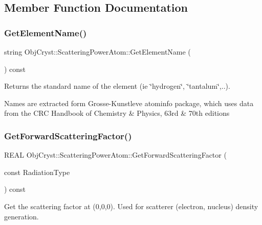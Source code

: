 \subsection{Member Function Documentation}
\mbox{\label{class_obj_cryst_1_1_scattering_power_atom_a149d682bc467b524ff42c5ab69b678ba}} 
\subsubsection{\texorpdfstring{GetElementName()}{GetElementName()}}
{\footnotesize\ttfamily string Obj\+Cryst\+::\+Scattering\+Power\+Atom\+::\+Get\+Element\+Name (\begin{DoxyParamCaption}{ }\end{DoxyParamCaption}) const}



Returns the standard name of the element (ie \char`\"{}hydrogen\char`\"{}, \char`\"{}tantalum\char`\"{},..). 

Names are extracted form Grosse-\/\+Kunstleve \textquotesingle{}atominfo\textquotesingle{} package, which uses data from the C\+RC Handbook of Chemistry \& Physics, 63rd \& 70th editions \mbox{\label{class_obj_cryst_1_1_scattering_power_atom_abe4d6e3b47759d143b5686abf490744f}} 
\subsubsection{\texorpdfstring{GetForwardScatteringFactor()}{GetForwardScatteringFactor()}}
{\footnotesize\ttfamily R\+E\+AL Obj\+Cryst\+::\+Scattering\+Power\+Atom\+::\+Get\+Forward\+Scattering\+Factor (\begin{DoxyParamCaption}\item[{const}]{Radiation\+Type }\end{DoxyParamCaption}) const\hspace{0.3cm}{\ttfamily [virtual]}}

Get the scattering factor at (0,0,0). Used for scatterer (electron, nucleus) density generation. 

